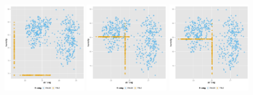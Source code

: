 \documentclass[article]{jss}
\begin{document}
\begin{center}
\begin{figure}[h]
\begin{centering}
\includegraphics[width=0.32\textwidth]{graph/fig3-1-below10} 
\includegraphics[width=0.32\textwidth]{graph/fig3-2-median}
\includegraphics[width=0.32\textwidth]{graph/fig3-3-mean} 
\par\end{centering}


\end{figure}
\end{center}
\end{document}
